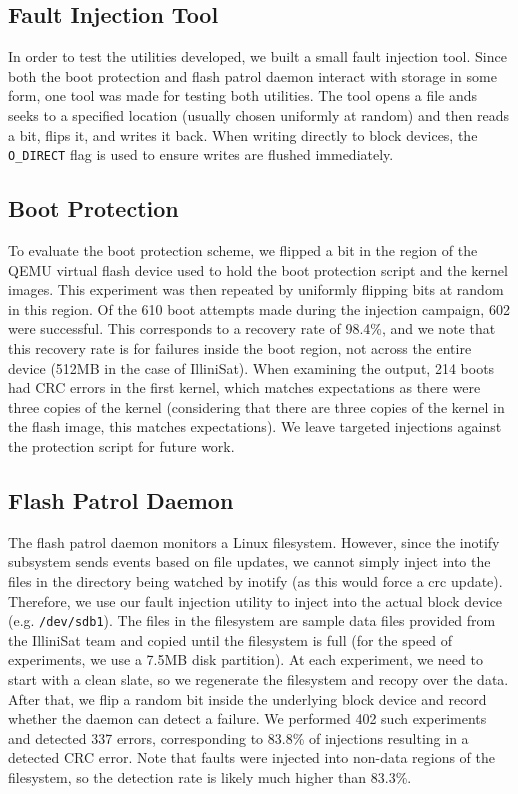 \subsection{Fault Injection Tool}

In order to test the utilities developed, we built a small fault injection
tool.  Since both the boot protection and flash patrol daemon interact with
storage in some form, one tool was made for testing both utilities.  The tool
opens a file ands seeks to a specified location (usually chosen uniformly at
random) and then reads a bit, flips it, and writes it back.  When writing
directly to block devices, the {\texttt {O\_DIRECT}} flag is used to ensure
writes are flushed immediately.

\subsection{Boot Protection}
To evaluate the boot protection scheme, we flipped a bit in the region of the
QEMU virtual flash device used to hold the boot protection script and the kernel
images.  This experiment was then repeated by uniformly flipping bits at random
in this region.  Of the 610 boot attempts made during the injection campaign,
602 were successful.  This corresponds to a recovery rate of 98.4\%, and we note
that this recovery rate is for failures inside the boot region, not across the
entire device (512MB in the case of IlliniSat).  When examining the output, 214
boots had CRC errors in the first kernel, which matches expectations as there
were three copies of the kernel (considering that there are three copies of the
kernel in the flash image, this matches expectations).  We leave targeted
injections against the protection script for future work.

\subsection{Flash Patrol Daemon}
The flash patrol daemon monitors a Linux filesystem.  However, since the
inotify subsystem sends events based on file updates, we cannot simply
inject into the files in the directory being watched by inotify (as this would
force a crc update). Therefore, we use our fault injection utility to inject
into the actual block device (e.g.  \texttt{/dev/sdb1}).  The files in the
filesystem are sample data files provided from the IlliniSat team and copied
until the filesystem is full (for the speed of experiments, we use a 7.5MB disk
partition).  At each experiment, we need to start with a clean slate, so we
regenerate the filesystem and recopy over the data.  After that, we flip a
random bit inside the underlying block device and record whether the daemon can
detect a failure.  We performed 402 such experiments and detected 337 errors,
corresponding to 83.8\% of injections resulting in a detected CRC error.
Note that faults were injected into non-data regions of the filesystem, so the
detection rate is likely much higher than 83.3\%.
